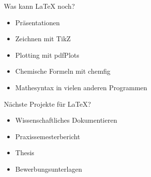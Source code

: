 \documentclass[presentation,aspectratio=169]{beamer}
\begin{document}
\begin{frame}{Was kann \LaTeX{} noch?}
  \begin{itemize}
    \item Präsentationen
    \item Zeichnen mit TikZ
    \item Plotting mit pdfPlots
    \item Chemische Formeln mit chemfig
    \bigskip
    \item Mathesyntax in vielen anderen Programmen
  \end{itemize}
\end{frame}

\begin{frame}{Nächste Projekte für \LaTeX{}?}
  \begin{itemize}
    \item Wissenschaftliches Dokumentieren
    \item Praxissemesterbericht
    \item Thesis
    \bigskip
    \item Bewerbungsunterlagen
  \end{itemize}
\end{frame}
\end{document}
